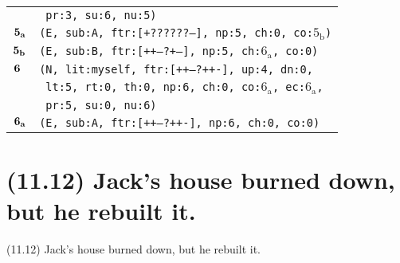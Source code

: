 \documentclass{article}
\begin{document}
\begin{minipage}{\textwidth}
{\begin{tabular}{|r|l|}
    & \texttt{\texttt{~pr:3,~su:6,~nu:5)}} \\
    ${\textbf{\textrm{5}}_{\textbf{\textrm{a}}}}$ & \texttt{\texttt{(E,~sub:A,~ftr:[+??????--],~np:5,~ch:0,~co:${\textrm{5}_{\textrm{b}}}$)}} \\
    ${\textbf{\textrm{5}}_{\textbf{\textrm{b}}}}$ & \texttt{\texttt{(E,~sub:B,~ftr:[++---?+--],~np:5,~ch:${\textrm{6}_{\textrm{a}}}$,~co:0)}} \\
    ${\textbf{\textrm{6}}_{\phantom{z}}}$ & \texttt{\texttt{(N,~lit:myself,~ftr:[++---?++-],~up:4,~dn:0,}} \\
    & \texttt{\texttt{~lt:5,~rt:0,~th:0,~np:6,~ch:0,~co:${\textrm{6}_{\textrm{a}}}$,~ec:${\textrm{6}_{\textrm{a}}}$,}} \\
    & \texttt{\texttt{~pr:5,~su:0,~nu:6)}} \\
    ${\textbf{\textrm{6}}_{\textbf{\textrm{a}}}}$ & \texttt{\texttt{(E,~sub:A,~ftr:[++---?++-],~np:6,~ch:0,~co:0)}} \\
    \hline
  \end{tabular}
  }
\end{minipage}
\bigbreak

\clearpage

%
%

\section*{(11.12) Jack's house burned down, but he rebuilt it.}

\bigbreak
\begin{enumerate*}
\item[(11.12)] Jack's house burned down, but he rebuilt it.
\end{enumerate*}
\bigbreak
\end{document}
